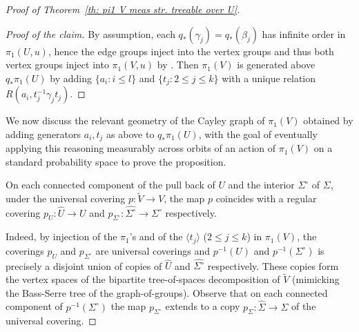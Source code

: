 \documentclass[11pt]{amsart}
\theoremstyle{definition}
\theoremstyle{plain}
\newcommand{\<}{\langle}
\renewcommand{\>}{\rangle}
\begin{document}
\begin{proof}[Proof of Theorem~\ref{th: pi1 V meas str. treeable over U}]
\begin{proof}[Proof of the claim]
By assumption, each $q_*(\gamma_j) = q_*(\beta_j)$ has infinite order in $\pi_1(U,u)$, hence the edge groups inject into the vertex groups and thus both vertex groups inject into $\pi_1(V,u)$ by \cite[Theorem 11, Corollary 1]{Serre}.
Then $\pi_1(V)$ is generated above $ q_*\pi_1(U)$ by adding $\{a_i : i \leq l\}$ and $\{t_j : 2\leq  j \leq k\}$ with a unique relation
$R(a_i,t_j^{-1}\gamma_j t_j)$.
\end{proof}

We now discuss the relevant geometry of the Cayley graph of $\pi_1(V)$ obtained by adding generators $a_i, t_j$ as above to $q_*\pi_1(U)$, with the goal of eventually applying this reasoning measurably across orbits of an action of $\pi_1(V)$ on a standard probability space to prove the proposition.

On each connected component of the pull back  of $U$ and the interior $\Sigma^{\circ}$ of $\Sigma$, under the universal covering
 $p:\widetilde{V}\to V$, the map $p$ coincides with a regular covering $p_{U}:\widehat{U}\to U$ and $p_{\Sigma^{\circ}}:\widehat{\Sigma^{\circ}}\to\Sigma^{\circ}$ respectively.


 Indeed, by injection of the $\pi_1$'s and of the $\langle  t_j\rangle $ ($2\leq j\leq k$)
  in $\pi_1(V)$, the coverings $p_{U}$ and $p_{\Sigma^{\circ}}$ are universal coverings
  and
   $p^{-1}(U)$ and $p^{-1}(\Sigma^{\circ})$ is precisely a disjoint union of copies of $\widehat{U}$ and $\widehat{\Sigma^{\circ}}$ respectively.
These copies form the vertex spaces of the bipartite tree-of-spaces decomposition of $\widetilde{V}$ (mimicking the Bass-Serre tree of the graph-of-groups).
 Observe that on each connected component of $p^{-1}(\Sigma^{\circ})$ the map $p_{\Sigma^{\circ}}$ extends to a copy $p_{\Sigma}:\widehat{\Sigma}\to \Sigma$ of the universal covering.



\end{proof}
\end{document}
